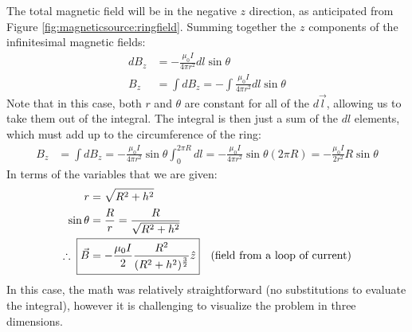 The total magnetic field will be in the negative $z$ direction, as anticipated from Figure \ref{fig:magneticsource:ringfield}. Summing together the $z$ components of the infinitesimal magnetic fields:
\begin{align*}
dB_z &= -\frac{\mu_0 I}{4\pi r^2}dl\sin\theta\\
B_z &= \int dB_z =-\int \frac{\mu_0 I}{4\pi r^2}dl\sin\theta
\end{align*}
Note that in this case, both $r$ and $\theta$ are constant for all of the $d\vec l$, allowing us to take them out of the integral. The integral is then just a sum of the $dl$ elements, which must add up to the circumference of the ring:
\begin{align*}
B_z &= \int dB_z = -\frac{\mu_0 I}{4\pi r^2}\sin\theta \int_0^{2\pi R} dl=-\frac{\mu_0 I}{4\pi r^2}\sin\theta (2\pi R)=-\frac{\mu_0 I}{2r^2}R\sin\theta
\end{align*}
In terms of the variables that we are given:
\begin{align*}
r &= \sqrt{R^2+h^2}\\
\sin\theta &=\frac{R}{r}=\frac{R}{\sqrt{R^2+h^2}}\\
\therefore\;\; \Aboxed{\vec B &= -\frac{\mu_0 I}{2} \frac{R^2}{(R^2+h^2)^\frac{3}{2}} \hat z}\quad\text{(field from a loop of current)}
\end{align*}
In this case, the math was relatively straightforward (no substitutions to evaluate the integral), however it is challenging to visualize the problem in three dimensions.

